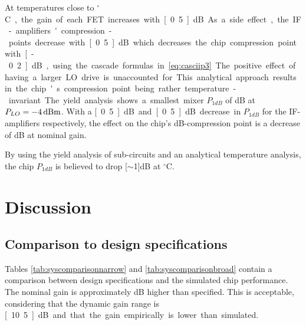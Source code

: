 			At temperatures close to \unit[-40]{$^\circ$C}, the gain of each FET increases with \unit[0.5]{dB}. As a side effect, the IF-amplifiers' compression-points decrease with \unit[0.5]{dB} which decreases the chip compression point with \unit[-0.2]{dB}, using the cascade formulas in \autoref{eq:casciip3}. The positive effect of having a larger LO drive is unaccounted for.	This analytical approach results in the chip's compression point being rather temperature-invariant. The yield analysis shows a smallest mixer $P_{1dB}$ of \unit[10]{dB} at $P_{LO}=\unit[-4]{dBm}$. With a \unit[0.5]{dB} and \unit[0.5]{dB} decrease in $P_{1dB}$ for the IF-amplifiers respectively, the effect on the chip's \unit[1]{dB}-compression point is a decrease of \unit[1]{dB} at nominal gain.

			By using the yield analysis of sub-circuits and an analytical temperature analysis, the chip $P_{1dB}$ is believed to drop \unit[$\sim$1]{dB} at \unit[-40]{$^\circ$C}.


	\section{Discussion}
		\subsection{Comparison to design specifications}
			Tables \ref{tab:syscomparisonnarrow} and \ref{tab:syscomparisonbroad} contain a comparison between design specifications and the simulated chip performance. The nominal gain is approximately \unit[1]{dB} higher than specified. This is acceptable, considering that the dynamic gain range is \unit[10.5]{dB} and that the gain empirically is lower than simulated.

